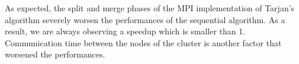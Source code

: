 As expected, the split and merge phases of the MPI implementation of Tarjan's algorithm severely worsen the performances of the sequential algorithm. As a result, we are always observing a speedup which is smaller than 1. Communication time between the nodes of the cluster is another factor that worsened the performances.